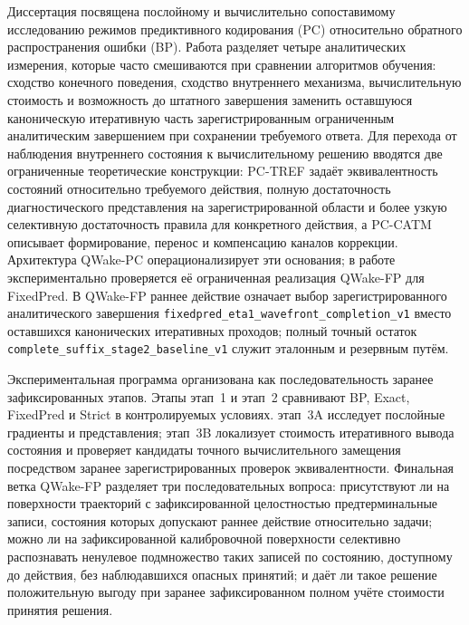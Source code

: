Диссертация посвящена послойному и вычислительно сопоставимому исследованию
режимов предиктивного кодирования (PC) относительно обратного распространения
ошибки (BP). Работа разделяет четыре аналитических измерения, которые часто
смешиваются при сравнении алгоритмов обучения: сходство конечного поведения,
сходство внутреннего механизма, вычислительную стоимость и возможность
до штатного завершения заменить оставшуюся каноническую итеративную часть
зарегистрированным ограниченным аналитическим завершением при сохранении
требуемого ответа. Для перехода
от наблюдения внутреннего состояния к вычислительному решению вводятся две
ограниченные теоретические конструкции: PC-TREF задаёт эквивалентность
состояний относительно требуемого действия, полную достаточность
диагностического представления на зарегистрированной области и более узкую
селективную достаточность правила
для конкретного действия, а PC-CATM описывает формирование, перенос и
компенсацию каналов коррекции. Архитектура QWake-PC операционализирует эти основания; в работе
экспериментально проверяется её ограниченная реализация QWake-FP для FixedPred.
В QWake-FP раннее действие означает выбор зарегистрированного аналитического
завершения \nolinkurl{fixedpred_eta1_wavefront_completion_v1} вместо
оставшихся канонических итеративных проходов; полный точный остаток
\nolinkurl{complete_suffix_stage2_baseline_v1} служит эталонным и
резервным путём.

Экспериментальная программа организована как последовательность заранее
зафиксированных этапов. Этапы этап~1 и этап~2 сравнивают BP, Exact, FixedPred
и Strict в контролируемых условиях. этап~3A исследует послойные градиенты и
представления; этап~3B локализует стоимость итеративного вывода состояния и
проверяет кандидаты точного вычислительного замещения посредством заранее
зарегистрированных проверок эквивалентности. Финальная ветка QWake-FP разделяет
три последовательных вопроса: присутствуют ли на поверхности траекторий с
зафиксированной целостностью предтерминальные записи, состояния которых допускают
раннее действие относительно задачи; можно ли на зафиксированной калибровочной
поверхности селективно распознавать ненулевое подмножество таких записей по состоянию,
доступному до действия, без наблюдавшихся опасных принятий; и даёт ли такое
решение положительную выгоду при
заранее зафиксированном полном учёте стоимости принятия решения.

